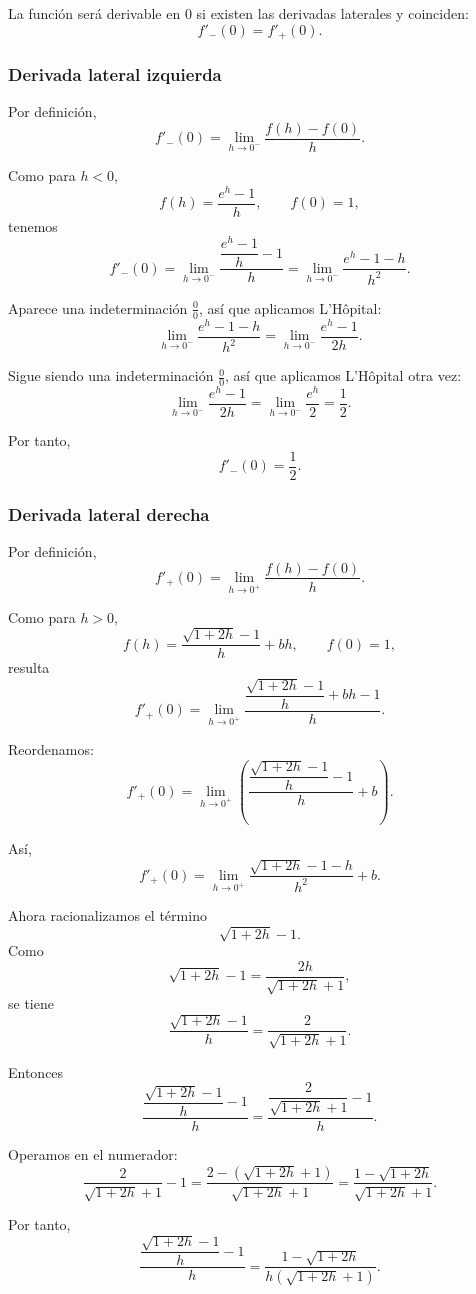 \documentclass[12pt]{article}
\begin{document}
La función será derivable en \(0\) si existen las derivadas laterales y coinciden:
\[
f'_-(0)=f'_+(0).
\]

\subsubsection*{Derivada lateral izquierda}

Por definición,
\[
f'_-(0)=\lim_{h\to 0^-}\frac{f(h)-f(0)}{h}.
\]

Como para \(h<0\),
\[
f(h)=\frac{e^h-1}{h},
\qquad
f(0)=1,
\]
tenemos
\[
f'_-(0)
=
\lim_{h\to 0^-}\frac{\dfrac{e^h-1}{h}-1}{h}
=
\lim_{h\to 0^-}\frac{e^h-1-h}{h^2}.
\]

Aparece una indeterminación \(\frac00\), así que aplicamos L'Hôpital:
\[
\lim_{h\to 0^-}\frac{e^h-1-h}{h^2}
=
\lim_{h\to 0^-}\frac{e^h-1}{2h}.
\]

Sigue siendo una indeterminación \(\frac00\), así que aplicamos L'Hôpital otra vez:
\[
\lim_{h\to 0^-}\frac{e^h-1}{2h}
=
\lim_{h\to 0^-}\frac{e^h}{2}
=
\frac12.
\]

Por tanto,
\[
f'_-(0)=\frac12.
\]

\subsubsection*{Derivada lateral derecha}

Por definición,
\[
f'_+(0)=\lim_{h\to 0^+}\frac{f(h)-f(0)}{h}.
\]

Como para \(h>0\),
\[
f(h)=\frac{\sqrt{1+2h}-1}{h}+bh,
\qquad
f(0)=1,
\]
resulta
\[
f'_+(0)
=
\lim_{h\to 0^+}\frac{\dfrac{\sqrt{1+2h}-1}{h}+bh-1}{h}.
\]

Reordenamos:
\[
f'_+(0)
=
\lim_{h\to 0^+}
\left(
\frac{\dfrac{\sqrt{1+2h}-1}{h}-1}{h}
+
b
\right).
\]

Así,
\[
f'_+(0)
=
\lim_{h\to 0^+}
\frac{\sqrt{1+2h}-1-h}{h^2}
+b.
\]

Ahora racionalizamos el término
\[
\sqrt{1+2h}-1.
\]
Como
\[
\sqrt{1+2h}-1=\frac{2h}{\sqrt{1+2h}+1},
\]
se tiene
\[
\frac{\sqrt{1+2h}-1}{h}
=
\frac{2}{\sqrt{1+2h}+1}.
\]

Entonces
\[
\frac{\dfrac{\sqrt{1+2h}-1}{h}-1}{h}
=
\frac{\dfrac{2}{\sqrt{1+2h}+1}-1}{h}.
\]

Operamos en el numerador:
\[
\frac{2}{\sqrt{1+2h}+1}-1
=
\frac{2-(\sqrt{1+2h}+1)}{\sqrt{1+2h}+1}
=
\frac{1-\sqrt{1+2h}}{\sqrt{1+2h}+1}.
\]

Por tanto,
\[
\frac{\dfrac{\sqrt{1+2h}-1}{h}-1}{h}
=
\frac{1-\sqrt{1+2h}}{h(\sqrt{1+2h}+1)}.
\]
\end{document}
